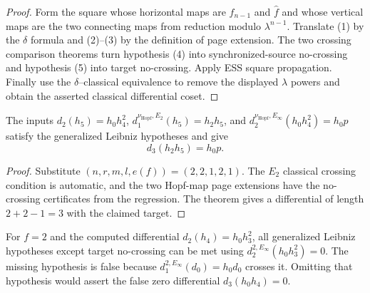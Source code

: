 \begin{proof}
  Form the square whose horizontal maps are
  $\widehat f_{n-1}$ and $\widehat f$ and whose vertical maps are the two
  connecting maps from reduction modulo $\lambda^{n-1}$.  Translate (1) by the
  $\delta$ formula and (2)--(3) by the definition of page extension.  The two
  crossing comparison theorems turn hypothesis (4) into synchronized-source
  no-crossing and hypothesis (5) into target no-crossing.  Apply ESS square
  propagation.  Finally use the $\delta$--classical equivalence to remove the
  displayed $\lambda$ powers and obtain the asserted classical differential
  coset.
\end{proof}

\begin{proposition}
  \label{prop:leibniz-positive-regression}
  \notready
  The inputs
  $d_2(h_5)=h_0h_4^2$,
  $d_1^{\nu_{\mathrm{Hopf}},E_2}(h_5)=h_2h_5$, and
  $d_2^{\nu_{\mathrm{Hopf}},E_\infty}(h_0h_4^2)=h_0p$
  satisfy the generalized Leibniz hypotheses and give
  \[
    d_3(h_2h_5)=h_0p.
  \]
\end{proposition}

\begin{proof}
  Substitute $(n,r,m,l,e(f))=(2,2,1,2,1)$.  The $E_2$ classical crossing
  condition is automatic, and the two Hopf-map page extensions have the
  no-crossing certificates from the regression.  The theorem gives a
  differential of length $2+2-1=3$ with the claimed target.
\end{proof}

\begin{proposition}
  \label{prop:leibniz-negative-regression}
  \notready
  For $f=2$ and the computed differential
  $d_2(h_4)=h_0h_3^2$, all generalized Leibniz hypotheses except target
  no-crossing can be met using
  $d_2^{2,E_\infty}(h_0h_3^2)=0$.  The missing hypothesis is false because
  $d_1^{2,E_\infty}(d_0)=h_0d_0$ crosses it.  Omitting that hypothesis would
  assert the false zero differential $d_3(h_0h_4)=0$.
\end{proposition}


